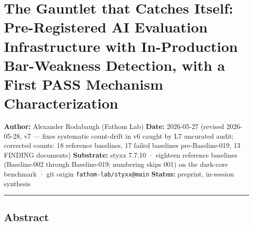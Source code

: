 \documentclass[
]{article}
\author{}
\date{}
\begin{document}
\section{The Gauntlet that Catches Itself: Pre-Registered AI Evaluation
Infrastructure with In-Production Bar-Weakness Detection, with a First
PASS Mechanism
Characterization}\label{the-gauntlet-that-catches-itself-pre-registered-ai-evaluation-infrastructure-with-in-production-bar-weakness-detection-with-a-first-pass-mechanism-characterization}

\textbf{Author:} Alexander Rodabaugh (Fathom Lab) \textbf{Date:}
2026-05-27 (revised 2026-05-28, v7 --- fixes systematic count-drift in
v6 caught by L7 uncurated audit; corrected counts: 18 reference
baselines, 17 failed baselines pre-Baseline-019, 13 FINDING documents)
\textbf{Substrate:} styxx 7.7.10 · eighteen reference baselines
(Baseline-002 through Baseline-019; numbering skips 001) on the
dark-core benchmark · git origin \texttt{fathom-lab/styxx@main}
\textbf{Status:} preprint, in-session synthesis

\begin{center}\rule{0.5\linewidth}{0.5pt}\end{center}

\subsection{Abstract}\label{abstract}
\end{document}

